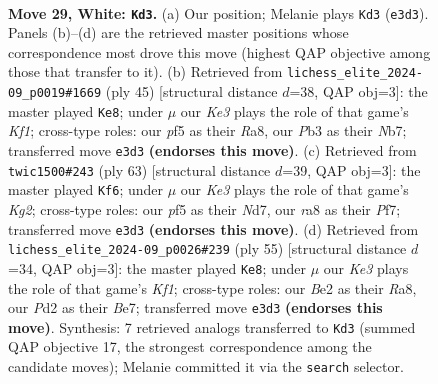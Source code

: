 \documentclass[11pt]{article}
\begin{document}
\clearpage

\begin{figure}[p]\centering
\begin{subfigure}{0.46\textwidth}\centering
\resizebox{\linewidth}{!}{%
\newchessgame
\chessboard[
  setfen={r7/pbpp4/1p3nkp/5p2/2P2P2/NP2K3/P2PB2P/R7 w - - 3 29},
  showmover=false,
  pgfstyle=straightmove, color=movearrow, markmove={e3-d3}
]}
\caption{}
\end{subfigure}\hfill
\begin{subfigure}{0.46\textwidth}\centering
\resizebox{\linewidth}{!}{%
\newchessgame
\chessboard[
  setfen={r4k2/pnB1bppp/4p3/2p5/N1P5/6P1/PP3P1P/3R2K1 b - - 2 23},
  showmover=false,
  pgfstyle=straightmove, color=movearrow, markmove={f8-e8}
]}
\caption{}
\end{subfigure}
\\[4pt]
\begin{subfigure}{0.46\textwidth}\centering
\resizebox{\linewidth}{!}{%
\newchessgame
\chessboard[
  setfen={8/3n1pk1/ppNBp1pp/8/1PP5/3K2P1/Pb3P1P/8 b - - 2 32},
  showmover=false,
  pgfstyle=straightmove, color=movearrow, markmove={g7-f6}
]}
\caption{}
\end{subfigure}\hfill
\begin{subfigure}{0.46\textwidth}\centering
\resizebox{\linewidth}{!}{%
\newchessgame
\chessboard[
  setfen={r4k2/p3bp1p/1p1p2p1/n7/3P1P2/2P1K1P1/PB1N3P/4R3 b - - 3 28},
  showmover=false,
  pgfstyle=straightmove, color=movearrow, markmove={f8-e8}
]}
\caption{}
\end{subfigure}
\caption{\textbf{Move 29, White: \texttt{Kd3}.} (a) Our position; Melanie plays \texttt{Kd3} (\texttt{e3d3}). Panels (b)--(d) are the retrieved master positions whose correspondence most drove this move (highest QAP objective among those that transfer to it). (b) Retrieved from \texttt{lichess\_elite\_2024-09\_p0019\#1669} (ply 45) [structural distance $d$=38, QAP obj=3]: the master played \texttt{Ke8}; under $\mu$ our \emph{Ke3} plays the role of that game's \emph{Kf1}; cross-type roles: our \emph{p}f5 as their \emph{R}a8, our \emph{P}b3 as their \emph{N}b7; transferred move \texttt{e3d3} \textbf{(endorses this move)}. (c) Retrieved from \texttt{twic1500\#243} (ply 63) [structural distance $d$=39, QAP obj=3]: the master played \texttt{Kf6}; under $\mu$ our \emph{Ke3} plays the role of that game's \emph{Kg2}; cross-type roles: our \emph{p}f5 as their \emph{N}d7, our \emph{r}a8 as their \emph{P}f7; transferred move \texttt{e3d3} \textbf{(endorses this move)}. (d) Retrieved from \texttt{lichess\_elite\_2024-09\_p0026\#239} (ply 55) [structural distance $d$=34, QAP obj=3]: the master played \texttt{Ke8}; under $\mu$ our \emph{Ke3} plays the role of that game's \emph{Kf1}; cross-type roles: our \emph{B}e2 as their \emph{R}a8, our \emph{P}d2 as their \emph{B}e7; transferred move \texttt{e3d3} \textbf{(endorses this move)}. Synthesis: 7 retrieved analogs transferred to \texttt{Kd3} (summed QAP objective 17, the strongest correspondence among the candidate moves); Melanie committed it via the \texttt{search} selector.}
\label{fig:thought-m56}
\end{figure}
\end{document}

